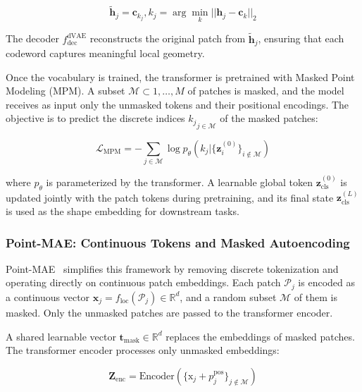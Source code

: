 \begin{equation}
    \tilde{\mathbf{h}}_j = \mathbf{c}_{k_j}, k_j = \arg\min_{k} || \mathbf{h}_j - \mathbf{c}_k ||_2
\end{equation}

The decoder $f_{\text{dec}}^{\text{dVAE}}$ reconstructs the original patch from $\tilde{\mathbf{h}}_j$, ensuring that each codeword captures meaningful local geometry.

Once the vocabulary is trained, the transformer is pretrained with Masked Point Modeling (MPM). A subset $\mathcal{M} \subset {1, \dots, M}$ of patches is masked, and the model receives as input only the unmasked tokens and their positional encodings. The objective is to predict the discrete indices ${k_j}_{j \in \mathcal{M}}$ of the masked patches:

\begin{equation}
    \mathcal{L}_{\text{MPM}} = - \sum_{j \in \mathcal{M}} \log p_\theta(k_j | \{\mathbf{z}_i^{(0)}\}_{i \notin \mathcal{M}})
\end{equation}

where $p_\theta$ is parameterized by the transformer. A learnable global token $\mathbf{z}_{\text{cls}}^{(0)}$ is updated jointly with the patch tokens during pretraining, and its final state $\mathbf{z}_{\text{cls}}^{(L)}$ is used as the shape embedding for downstream tasks.


\subsubsection{Point-MAE: Continuous Tokens and Masked Autoencoding}
\label{sssec:pointmae}

Point-MAE~\cite{pmae} simplifies this framework by removing discrete tokenization and operating directly on continuous patch embeddings. Each patch $\mathcal{P}_j$ is encoded as a continuous vector $\mathbf{x}_j = f_{\text{loc}}(\mathcal{P}_j) \in \mathbb{R}^{d}$, and a random subset $\mathcal{M}$ of them is masked. Only the unmasked patches are passed to the transformer encoder.

A shared learnable vector $\mathbf{t}_{\text{mask}} \in \mathbb{R}^d$ replaces the embeddings of masked patches. The transformer encoder processes only unmasked embeddings:

\begin{equation}
  \mathbf{Z}_\text{enc}=\text{Encoder}(\{\text{x}_j+p_j^\text{pos}\}_{j \notin \mathcal{M}})
\end{equation}

